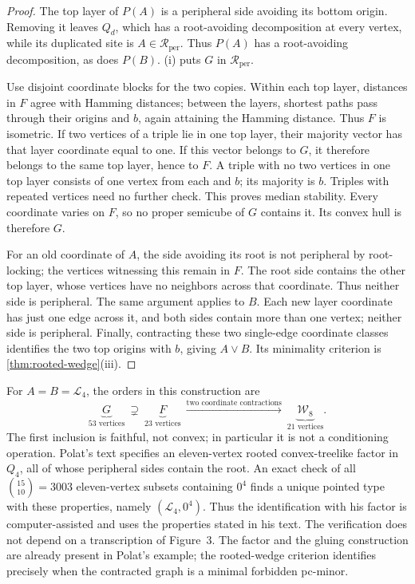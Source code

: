 \documentclass[11pt]{article}
\theoremstyle{definition}
\theoremstyle{remark}
\newcommand{\Rper}{\mathcal R_{\mathrm{per}}}
\begin{document}
\begin{proof}
The top layer of \(P(A)\) is a peripheral side avoiding its bottom origin.
Removing it leaves \(Q_d\), which has a root-avoiding decomposition at
every vertex, while its duplicated site is \(A\in\Rper\). Thus
\(P(A)\) has a root-avoiding decomposition, as does \(P(B)\).
(i) puts \(G\) in \(\Rper\).

Use disjoint coordinate blocks for the two copies. Within each top layer,
distances in \(F\) agree with Hamming distances; between the layers,
shortest paths pass through their origins and \(b\), again attaining the
Hamming distance. Thus \(F\) is isometric. If two vertices of a triple
lie in one top layer, their majority vector has that layer coordinate
equal to one. If this vector belongs to \(G\), it therefore belongs to
the same top layer, hence to \(F\). A triple with no two vertices in
one top layer consists of one vertex from each and \(b\); its majority
is \(b\). Triples with repeated vertices need no further check. This
proves median stability. Every coordinate varies on \(F\), so no proper
semicube of \(G\) contains it. Its convex hull is therefore \(G\).

For an old coordinate of \(A\), the side avoiding its root is not
peripheral by root-locking; the vertices witnessing this remain in \(F\).
The root side contains the other top layer, whose vertices have no
neighbors across that coordinate. Thus neither side is peripheral.
The same argument applies to \(B\). Each new layer coordinate has just
one edge across it, and both sides contain more than one vertex; neither
side is peripheral. Finally, contracting these two single-edge coordinate
classes identifies the two top origins with \(b\), giving \(A\vee B\).
Its minimality criterion is \cref{thm:rooted-wedge}(iii).
\end{proof}

For \(A=B=\mathcal L_4\), the orders in this construction are
\[
 \underbrace{G}_{53\text{ vertices}}
 \ \supsetneq\ {}
 \underbrace{F}_{23\text{ vertices}}
 \ \xrightarrow{\text{two coordinate contractions}}\ {}
 \underbrace{\mathcal W_8}_{21\text{ vertices}}.
\]
The first inclusion is faithful, not convex; in particular it is not a
conditioning operation. Polat's text specifies an eleven-vertex rooted
convex-treelike factor in \(Q_4\), all of whose peripheral sides contain
the root. An exact check of all \(\binom{15}{10}=3003\) eleven-vertex
subsets containing \(0^4\) finds a unique pointed type with these
properties, namely \((\mathcal L_4,0^4)\). Thus the identification with
his factor is computer-assisted and uses the properties stated in his
text. The verification does not depend on a transcription of Figure~3.
The factor and the gluing construction are already present in Polat's
example; the rooted-wedge criterion identifies precisely when the
contracted graph is a minimal forbidden pc-minor.
\end{document}
